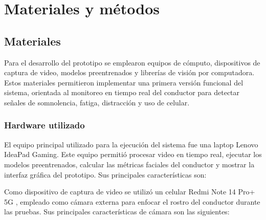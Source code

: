\documentclass[conference]{IEEEtran}
\begin{document}
\section{Materiales y métodos}

\subsection{Materiales}

Para el desarrollo del prototipo se emplearon equipos de cómputo, dispositivos de captura de video, modelos preentrenados y librerías de visión por computadora. Estos materiales permitieron implementar una primera versión funcional del sistema, orientada al monitoreo en tiempo real del conductor para detectar señales de somnolencia, fatiga, distracción y uso de celular.

\subsubsection{Hardware utilizado}

El equipo principal utilizado para la ejecución del sistema fue una laptop Lenovo IdeaPad Gaming. Este equipo permitió procesar video en tiempo real, ejecutar los modelos preentrenados, calcular las métricas faciales del conductor y mostrar la interfaz gráfica del prototipo. Sus principales características son:

\begin{table}[H]
\centering
\caption{Características de la laptop utilizada}
\label{tab:caracteristicas_laptop}
\end{table}

Como dispositivo de captura de video se utilizó un celular Redmi Note 14 Pro+ 5G \parencite{xiaomiRedmiNote14ProPlus}, empleado como cámara externa para enfocar el rostro del conductor durante las pruebas. Sus principales características de cámara son las siguientes:
\end{document}

